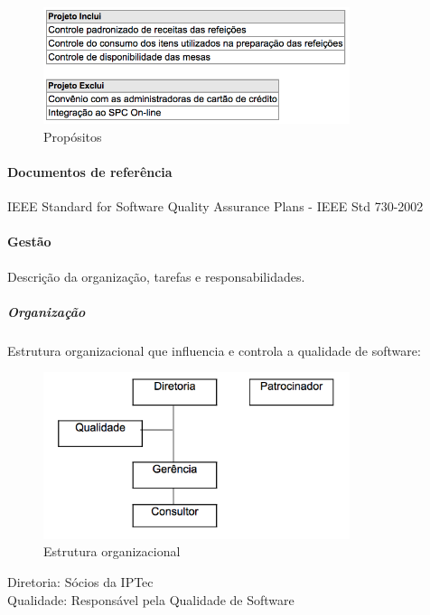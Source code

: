 \begin{figure}[H]
  \centering
  \includegraphics[width=0.8\textwidth]{softwareengineer/images/definition-quality} 
  \caption{Propósitos}
  \label{fig:definition-quality} 
\end{figure}

\paragraph{Documentos de referência}

IEEE Standard for Software Quality Assurance Plans - IEEE Std 730-2002

\paragraph{Gestão}

Descrição da organização, tarefas e responsabilidades.

\subparagraph{Organização}

Estrutura organizacional que influencia e controla a qualidade de software:

\begin{figure}[H]
  \centering
  \includegraphics[width=0.8\textwidth]{softwareengineer/images/hierarchy} 
  \caption{Estrutura organizacional}
  \label{fig:hierarchy} 
\end{figure}

Diretoria: Sócios da IPTec \\

Qualidade: Responsável pela Qualidade de Software \\

